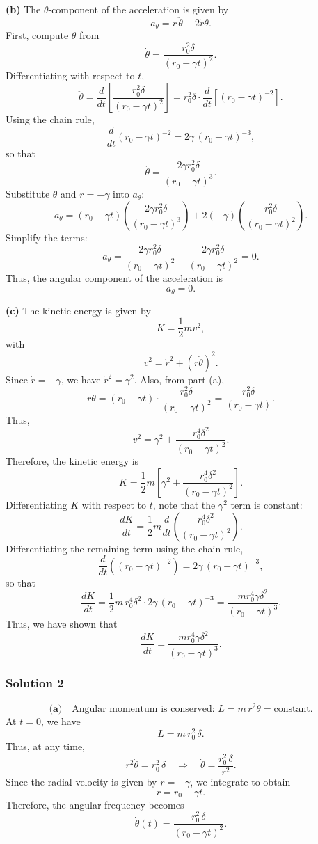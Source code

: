 \documentclass{article}
\begin{document}
\medskip

\textbf{(b)} The \(\theta\)-component of the acceleration is given by
\[
a_\theta = r\,\ddot{\theta} + 2\dot{r}\dot{\theta}.
\]
First, compute \(\ddot{\theta}\) from
\[
\dot{\theta} = \frac{r_0^2 \delta}{(r_0-\gamma t)^2}.
\]
Differentiating with respect to \(t\),
\[
\ddot{\theta} = \frac{d}{dt}\left[\frac{r_0^2 \delta}{(r_0-\gamma t)^2}\right] = r_0^2 \delta \cdot \frac{d}{dt}\left[(r_0-\gamma t)^{-2}\right].
\]
Using the chain rule,
\[
\frac{d}{dt}(r_0-\gamma t)^{-2} = 2\gamma\,(r_0-\gamma t)^{-3},
\]
so that
\[
\ddot{\theta} = \frac{2\gamma r_0^2 \delta}{(r_0-\gamma t)^3}.
\]
Substitute \(\ddot{\theta}\) and \(\dot{r} = -\gamma\) into \(a_\theta\):
\[
a_\theta = (r_0-\gamma t)\left(\frac{2\gamma r_0^2 \delta}{(r_0-\gamma t)^3}\right) + 2(-\gamma)\left(\frac{r_0^2 \delta}{(r_0-\gamma t)^2}\right).
\]
Simplify the terms:
\[
a_\theta = \frac{2\gamma r_0^2 \delta}{(r_0-\gamma t)^2} - \frac{2\gamma r_0^2 \delta}{(r_0-\gamma t)^2} = 0.
\]
Thus, the angular component of the acceleration is
\[
\boxed{a_\theta = 0}.
\]

\medskip

\textbf{(c)} The kinetic energy is given by
\[
K = \frac{1}{2}m v^2,
\]
with 
\[
v^2 = \dot{r}^2 + (r\dot{\theta})^2.
\]
Since \(\dot{r} = -\gamma\), we have \(\dot{r}^2 = \gamma^2\). Also, from part (a),
\[
r\dot{\theta} = (r_0-\gamma t) \cdot \frac{r_0^2 \delta}{(r_0-\gamma t)^2} = \frac{r_0^2 \delta}{(r_0-\gamma t)}.
\]
Thus,
\[
v^2 = \gamma^2 + \frac{r_0^4 \delta^2}{(r_0-\gamma t)^2}.
\]
Therefore, the kinetic energy is
\[
K = \frac{1}{2}m\left[\gamma^2 + \frac{r_0^4 \delta^2}{(r_0-\gamma t)^2}\right].
\]
Differentiating \(K\) with respect to \(t\), note that the \(\gamma^2\) term is constant:
\[
\frac{dK}{dt} = \frac{1}{2}m \frac{d}{dt}\left(\frac{r_0^4 \delta^2}{(r_0-\gamma t)^2}\right).
\]
Differentiating the remaining term using the chain rule,
\[
\frac{d}{dt}\left((r_0-\gamma t)^{-2}\right) = 2\gamma\,(r_0-\gamma t)^{-3},
\]
so that
\[
\frac{dK}{dt} = \frac{1}{2}m\, r_0^4 \delta^2 \cdot 2\gamma\,(r_0-\gamma t)^{-3} = \frac{m r_0^4 \gamma \delta^2}{(r_0-\gamma t)^3}.
\]
Thus, we have shown that
\[
\boxed{\frac{dK}{dt} = \frac{m r_0^4 \gamma \delta^2}{(r_0-\gamma t)^3}}.
\]


\subsubsection{Solution 2}
\[
\textbf{(a)}\quad \text{Angular momentum is conserved: } L = m\,r^2\dot{\theta} = \text{constant}.
\]
At \( t=0 \), we have 
\[
L = m\,r_0^2\,\delta.
\]
Thus, at any time,
\[
r^2\dot{\theta} = r_0^2\,\delta \quad \Longrightarrow \quad \dot{\theta} = \frac{r_0^2\,\delta}{r^2}.
\]
Since the radial velocity is given by \( \dot{r} = -\gamma \), we integrate to obtain
\[
r = r_0 - \gamma t.
\]
Therefore, the angular frequency becomes
\[
\dot{\theta}(t) = \frac{r_0^2\,\delta}{(r_0 - \gamma t)^2}.
\]
\end{document}
